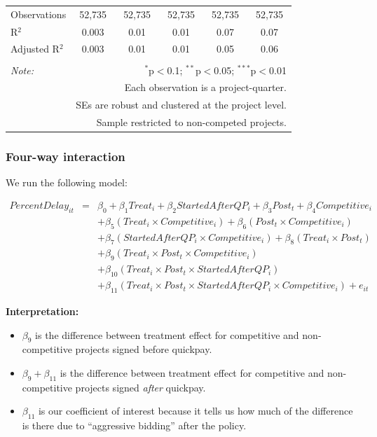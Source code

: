 \documentclass[
]{article}
\providecommand{\tightlist}{%
  \setlength{\itemsep}{0pt}\setlength{\parskip}{0pt}}
\begin{document}
\begin{table}[H]
\begin{tabular}{@{\extracolsep{-2pt}}lccccc}
Observations & 52,735 & 52,735 & 52,735 & 52,735 & 52,735 \\ 
R$^{2}$ & 0.003 & 0.01 & 0.01 & 0.07 & 0.07 \\ 
Adjusted R$^{2}$ & 0.003 & 0.01 & 0.01 & 0.05 & 0.06 \\ 
\hline 
\hline \\[-1.8ex] 
\textit{Note:}  & \multicolumn{5}{r}{$^{*}$p$<$0.1; $^{**}$p$<$0.05; $^{***}$p$<$0.01} \\ 
 & \multicolumn{5}{r}{Each observation is a project-quarter.} \\ 
 & \multicolumn{5}{r}{SEs are robust and clustered at the project level.} \\ 
 & \multicolumn{5}{r}{Sample restricted to non-competed projects.} \\ 
\end{tabular} 
\end{table}

\hypertarget{four-way-interaction}{%
\subsubsection{Four-way interaction}\label{four-way-interaction}}

We run the following model:

\[\begin{aligned} PercentDelay_{it} &=& \beta_0 +\beta_1 Treat_i+ \beta_2 StartedAfterQP_i+ \beta_3 Post_t+ \beta_4 Competitive_i\\ && +  \beta_5 (Treat_i \times Competitive_i) + \beta_6 (Post_t \times Competitive_i)\\ && +  \beta_7 (StartedAfterQP_i \times Competitive_i) +\beta_8 (Treat_i \times Post_t)\\ && + \beta_9 (Treat_i \times Post_t \times Competitive_i) \\ && + \beta_{10} (Treat_i \times Post_t \times StartedAfterQP_i )\\ && + \beta_{11} (Treat_i \times Post_t \times StartedAfterQP_i \times Competitive_i) + e_{it} \end{aligned}\]

\textbf{Interpretation:}

\begin{itemize}
\tightlist
\item
  \(\beta_9\) is the difference between treatment effect for competitive
  and non-competitive projects signed before quickpay.
\item
  \(\beta_9 + \beta_{11}\) is the difference between treatment effect
  for competitive and non-competitive projects signed \emph{after}
  quickpay.
\item
  \(\beta_{11}\) is our coefficient of interest because it tells us how
  much of the difference is there due to ``aggressive bidding'' after
  the policy.
\end{itemize}
\end{document}
